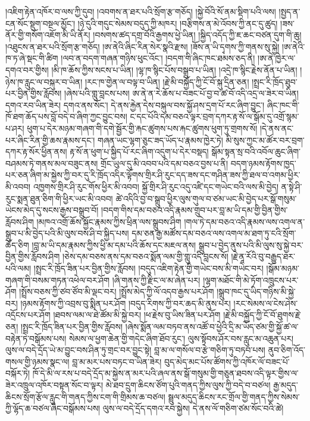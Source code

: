 \documentclass{article}
\begin{document}
།འཇིག་རྟེན་འཁོར་བ་ལས་ཀྱི་དུབ། །འབགས་ན་ཐར་པའི་སྲོག་རྩ་གཅོད། །སྐྱེ་བོའི་སོ་ནམ་སྡིག་པའི་ལས། །སྤྱད་ན་ངན་སོང་སྡུག་བསྔལ་མྱོང་། །ཉེ་དུའི་གདུང་སེམས་བདུད་ཀྱི་མཁར། །བརྩིགས་ན་མེ་འོབས་ཀྱི་ནང་དུ་ཚུད། །ཟས་ནོར་གྱི་གསོག་འཇོག་མི་ཡི་ནོར། །བསགས་ཚད་དགྲ་བོའི་རྒྱགས་ཕྱེ་ཡིན། །སྐྱིད་འདོད་ཀྱི་ཇ་ཆང་བཙན་དུག་གི་ཆུ། །འཐུངས་ན་ཐར་པའི་སྲོག་རྩ་གཅོད། །ཨ་ནེའི་ཞིང་རིན་སེར་སྣའི་རྫས། །ཟོས་ན་ཡི་དྭགས་ཀྱི་གནས་སུ་སྐྱེ། །ཨ་ནེའི་ཁ་ཏ་ཞེ་སྡང་གི་ཚིག །ལབ་ན་བདག་གཞན་གཉིས་ཕུང་འོང་། །བདག་གི་ཞིང་ཁང་ཐམས་ཅད་ནི། །ཨ་ནེ་ཁྱེར་ལ་དགའ་བར་གྱིས། །མི་ཁ་ཆོས་ཀྱིས་སངས་པ་ཡིན། །ལྷ་ཁ་སྙིང་པོས་བསྒྲུབ་པ་ཡིན། །འདྲེ་ཁ་སྙིང་རྗེས་ནོན་པ་ཡིན། །ཉེས་ཁ་རླུང་ལ་བསྐུར་བ་ཡིན། །རང་ཁ་གྱེན་ལ་བལྟ་བ་ཡིན། །རྗེ་མི་བསྐྱོད་ཀྱི་ངོ་བོ་སྐུ་དྲིན་ཅན། །སྤྲང་རི་ཁྲོད་ཐུབ་པར་བྱིན་གྱིས་རློབས། །ཞེས་པའི་གླུ་བླངས་པས། ཨ་ནེ་ན་རེ་ཆོས་པ་བཟང་པོ་བྱ་བ་ཚ་བོ་འདི་འདྲ་ལ་ཟེར་བ་ཡིན། དགའ་རབ་ཡིན་ཟེར། དགའ་ནས་སོང་། དེ་ནས་རྐྱེན་དེས་བསྐུལ་བས་སྐྱོ་ཤས་དྲག་པོ་རང་ཞིག་བྱུང་། ཞིང་ཁང་གི་ཁོ་ཐག་ཆོད་པས་བློ་བདེ་བ་ཞིག་ཀྱང་བྱུང་བས། ང་དང་པོའི་དམ་བཅའ་ལྟར་བྲག་དཀར་རྟ་སོ་ལ་སྒོམ་དུ་འགྲོ་སྙམ་པ་ཤར། ཕུག་པ་དེར་མཉམ་གཞག་གི་དགེ་སྦྱོར་གྱི་རྐང་ཚུགས་པས་རྐང་ཚུགས་ཕུག་ཏུ་གྲགས་སོ། །དེ་ནས་ནང་པར་ཞིང་རིན་གྱི་ཆས་རྣམས་དང་། གཞན་ཡང་ལྷག་ཅུང་ཟད་ཡོད་པ་རྣམས་ཁྱེར་ཏེ། མི་སུས་ཀྱང་མ་ཚོར་བར་བྲག་དཀར་རྟ་སོར་ཕྱིན་ནས། རྟ་སོ་ན་ཕུག་པ་སྐྱིད་པོ་རང་ཞིག་འདུག་པ་དེར་བསྡད། སྒོམ་སྟན་སྲ་བའི་འབོལ་ཆུང་ཞིག་བཤམས་ཏེ་གནས་མལ་བཟུང་ནས། གྲོང་ཡུལ་དུ་མི་འབབ་པའི་དམ་བཅའ་བྱས་པ་ནི། བདག་ཉམས་རྟོགས་ཁྱད་པར་ཅན་ཞིག་མ་སྐྱེས་ཀྱི་བར་དུ་རི་ཁྲོད་འདིར་ལྟོགས་གྲིར་ཤི་རུང་དད་ཟས་དང་གཤིན་ཟས་ཀྱི་ཐལ་བ་འགམ་ཕྱིར་མི་འབབ། འཁྱགས་གྲིར་ཤི་རུང་གོས་ཕྱིར་མི་འབབ། སྐྱོ་གྲིར་ཤི་རུང་འདུ་འཛི་དང་གཡེང་བའི་ལས་མི་བྱེད། ན་སྟེ་ཤི་རུང་སྨན་ཐུན་ཅིག་གི་ཕྱིར་ཡང་མི་འབབ། ཚེ་འདིའི་བྱ་བ་སྒྲུབ་ཕྱིར་ལུས་གུལ་བ་ཙམ་ཡང་མི་བྱེད་པར་སྒོ་གསུམ་ཡེངས་མེད་དུ་སངས་རྒྱས་བསྒྲུབ་བོ། །བདག་གིས་དམ་བཅའ་འདི་རྣམས་གྲུབ་པར་བླ་མ་ཡི་དམ་གྱི་བྱིན་གྱིས་རློབས་ཤིག །མཁའ་འགྲོ་ཆོས་སྐྱོང་རྣམས་ཀྱིས་ཕྲིན་ལས་སྒྲུབས་ཤིག །གལ་ཏེ་དམ་བཅའ་འདི་རྣམས་ལས་འགལ་ན་སྒྲུབ་པ་མི་བྱེད་པའི་མི་ལུས་བས་ཤི་བ་སྐྱིད་པས། དམ་ཅན་རྒྱ་མཚོས་དམ་བཅའ་ལས་འགལ་མ་ཐག་ཏུ་ངའི་སྲོག་ཆོད་ཅིག །བླ་མ་ཡི་དམ་རྣམས་ཀྱིས་ཕྱི་མ་དམ་པའི་ཆོས་དང་མཇལ་ནས། སྒྲུབ་པ་བྱེད་ནུས་པའི་མི་ལུས་སུ་སྐྱེ་བར་བྱིན་གྱིས་རློབས་ཤིག །ཅེས་དམ་བཅས་ནས་དམ་བཅའ་སྨོན་ལམ་གྱི་གླུ་འདི་བླངས་སོ། །རྗེ་ནཱ་རོའི་བུ་བརྒྱུད་ཐར་པའི་ལམ། །སྤྲང་རི་ཁྲོད་ཟིན་པར་བྱིན་གྱིས་རློབས། །བདུད་འཇིག་རྟེན་གྱི་གཡེང་བས་མི་གཡེང་བར། །སྒོམ་མཉམ་གཞག་གི་བསམ་གཏན་འཕེལ་བར་ཤོག །ཞི་གནས་ཀྱི་རྫིང་ལ་མ་ཞེན་པར། །ལྷག་མཐོང་གི་མེ་ཏོག་འཁྲུངས་པར་ཤོག །སྤྲོས་བཅས་ཀྱི་ཙབ་ཙོབ་མི་ལྡང་བར། །སྤྲོས་མེད་ཀྱི་ལོ་འདབ་རྒྱས་པར་ཤོག །སྒྲུབ་ཁང་དུ་ཡིད་གཉིས་མི་སྐྱེ་བར། །ཉམས་རྟོགས་ཀྱི་འབྲས་བུ་སྨིན་པར་ཤོག །བདུད་རིགས་ཀྱི་བར་ཆད་མི་ནུས་པར། །རང་སེམས་ལ་ངེས་ཤེས་འདྲོངས་པར་ཤོག །ཐབས་ལམ་ལ་ཐེ་ཚོམ་མི་སྐྱེ་བར། །ཕ་རྗེས་བུ་ཡིས་ཟིན་པར་ཤོག །རྗེ་མི་བསྐྱོད་ཀྱི་ངོ་བོ་ཐུགས་རྗེ་ཅན། །སྤྲང་རི་ཁྲོད་ཟིན་པར་བྱིན་གྱིས་རློབས། །ཞེས་སྨོན་ལམ་བཏབ་ནས་འཚོ་བ་ཕྱེའི་དྲི་མ་ཡོད་ཙམ་གྱི་སྐྱོ་ཚ་ལ་བརྟེན་ཏེ་བསྒོམས་པས། སེམས་ལ་ཕྱག་ཆེན་གྱི་གདེང་ཞིག་ཐོབ་རུང་། ལུས་སྟོབས་ཤོར་བས་རླུང་མ་འཆུན་པར། ལུས་ལ་བདེ་དྲོད་ཡེ་མ་བྱུང་བས་ཤིན་ཏུ་གྲང་བར་བྱུང་སྟེ། བླ་མ་ལ་གསོལ་བ་རྩེ་གཅིག་ཏུ་བཏབ་པས། ནུབ་ཅིག་འོད་གསལ་གྱི་ཉམས་སྣང་ལ། བླ་མ་མར་པས་བཏང་བ་ཡིན་ཟེར། བུད་མེད་མང་པོས་ཚོགས་ཀྱི་འཁོར་ལོ་བཟང་པོ་བསྐོར་ཏེ། ཁོ་དེ་མི་ལ་རས་པ་བདེ་དྲོད་མ་སྐྱེས་ན་མར་པའི་ཞལ་ནས་སྒོ་གསུམ་གྱི་གཅུན་ཐབས་འདི་ལྟར་གྱིས་ལ་ཟེར་འཁྲུལ་འཁོར་བསྟན་སོང་བ་ལྟར། མེ་ཐབ་དྲུག་ཆིངས་ཙོག་པུའི་གནད་ཀྱིས་ལུས་ཀྱི་བདེ་བ་བཙལ། རྒྱ་མདུད་ཆིངས་སྲོག་རྩོལ་རླུང་གི་གནད་ཀྱིས་ངག་གི་གྲིམས་ཆ་བཙལ། སྦྲུལ་མདུད་ཆིངས་རང་གྲོལ་གྱི་གནད་ཀྱིས་སེམས་ཀྱི་ལྷོད་ཆ་བཙལ་ཞིང་བསྒོམས་པས། ལུས་ལ་བདེ་དྲོད་དགའ་རབ་སྐྱེས། དེ་ནས་ལོ་གཅིག་ཙམ་སོང་བའི་ཚེ། 
\end{document}
